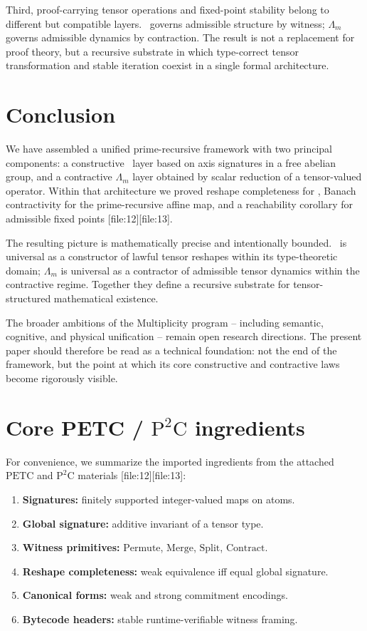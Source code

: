 \documentclass[11pt,a4paper]{article}
\newcommand{\PETC}{\mathrm{PETC}}
\begin{document}
Third, proof-carrying tensor operations and fixed-point stability belong to different but compatible layers. \PETC\ governs admissible structure by witness; \(\Lambda_m\) governs admissible dynamics by contraction. The result is not a replacement for proof theory, but a recursive substrate in which type-correct tensor transformation and stable iteration coexist in a single formal architecture.
\newpage
\section{Conclusion}

We have assembled a unified prime-recursive framework with two principal components: a constructive \PETC\ layer based on axis signatures in a free abelian group, and a contractive \(\Lambda_m\) layer obtained by scalar reduction of a tensor-valued operator. Within that architecture we proved reshape completeness for \PETC, Banach contractivity for the prime-recursive affine map, and a reachability corollary for admissible fixed points [file:12][file:13].

The resulting picture is mathematically precise and intentionally bounded. \PETC\ is universal as a constructor of lawful tensor reshapes within its type-theoretic domain; \(\Lambda_m\) is universal as a contractor of admissible tensor dynamics within the contractive regime. Together they define a recursive substrate for tensor-structured mathematical existence.

The broader ambitions of the Multiplicity program -- including semantic, cognitive, and physical unification -- remain open research directions. The present paper should therefore be read as a technical foundation: not the end of the framework, but the point at which its core constructive and contractive laws become rigorously visible.

\appendix

\section{Core PETC / \(\mathrm{P}^2\mathrm{C}\) ingredients}

For convenience, we summarize the imported ingredients from the attached \(\PETC\) and \(\mathrm{P}^2\mathrm{C}\) materials [file:12][file:13]:

\begin{enumerate}[leftmargin=2em]
\item \textbf{Signatures:} finitely supported integer-valued maps on atoms.
\item \textbf{Global signature:} additive invariant of a tensor type.
\item \textbf{Witness primitives:} \(\mathrm{Permute}\), \(\mathrm{Merge}\), \(\mathrm{Split}\), \(\mathrm{Contract}\).
\item \textbf{Reshape completeness:} weak equivalence iff equal global signature.
\item \textbf{Canonical forms:} weak and strong commitment encodings.
\item \textbf{Bytecode headers:} stable runtime-verifiable witness framing.
\end{enumerate}
\end{document}
